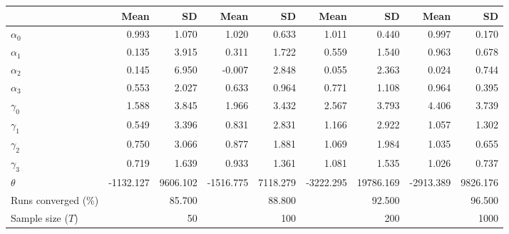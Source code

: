 
\begin{tabular}[t]{lrrrrrrrr}
\toprule
  & Mean & SD & Mean  & SD  & Mean   & SD   & Mean    & SD   \\
\midrule
$\alpha_{0}$ & 0.993 & 1.070 & 1.020 & 0.633 & 1.011 & 0.440 & 0.997 & 0.170\\
$\alpha_{1}$ & 0.135 & 3.915 & 0.311 & 1.722 & 0.559 & 1.540 & 0.963 & 0.678\\
$\alpha_{2}$ & 0.145 & 6.950 & -0.007 & 2.848 & 0.055 & 2.363 & 0.024 & 0.744\\
$\alpha_{3}$ & 0.553 & 2.027 & 0.633 & 0.964 & 0.771 & 1.108 & 0.964 & 0.395\\
$\gamma_{0}$ & 1.588 & 3.845 & 1.966 & 3.432 & 2.567 & 3.793 & 4.406 & 3.739\\
$\gamma_{1}$ & 0.549 & 3.396 & 0.831 & 2.831 & 1.166 & 2.922 & 1.057 & 1.302\\
$\gamma_{2}$ & 0.750 & 3.066 & 0.877 & 1.881 & 1.069 & 1.984 & 1.035 & 0.655\\
$\gamma_{3}$ & 0.719 & 1.639 & 0.933 & 1.361 & 1.081 & 1.535 & 1.026 & 0.737\\
$\theta$ & -1132.127 & 9606.102 & -1516.775 & 7118.279 & -3222.295 & 19786.169 & -2913.389 & 9826.176\\
Runs converged (\%) &  & 85.700 &  & 88.800 &  & 92.500 &  & 96.500\\
Sample size ($T$) &  & 50 &  & 100 &  & 200 &  & 1000\\
\bottomrule
\end{tabular}
